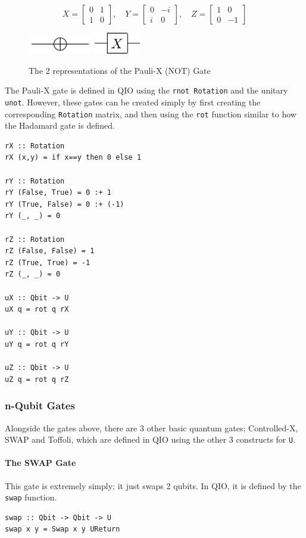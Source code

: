 \documentclass[a4paper,11pt, titlepage, twoside]{article}
\begin{document}
$$
X = 
\begin{bmatrix}
	0 & 1 \\
	1 & 0
\end{bmatrix},
\quad Y =
\begin{bmatrix}
	0 & -i \\
	i & 0
\end{bmatrix},
\quad Z =
\begin{bmatrix}
	1 & 0 \\
	0 & -1
\end{bmatrix}$$
\begin{figure}[H]
	\centering
	\includegraphics[width=0.25\textwidth]{not}
	\includegraphics[width=0.18\textwidth]{paulix}
	\caption{The 2 representations of the Pauli-X (NOT) Gate}
\end{figure}
The Pauli-X gate is defined in QIO using the \texttt{rnot Rotation} and the unitary \texttt{unot}. However, these gates can be created simply by first creating the corresponding \texttt{Rotation} matrix, and then using the \texttt{rot} function similar to how the Hadamard gate is defined.

\begin{verbatim}
rX :: Rotation
rX (x,y) = if x==y then 0 else 1

rY :: Rotation
rY (False, True) = 0 :+ 1
rY (True, False) = 0 :+ (-1)
rY (_, _) = 0

rZ :: Rotation
rZ (False, False) = 1
rZ (True, True) = -1
rZ (_, _) = 0

uX :: Qbit -> U
uX q = rot q rX

uY :: Qbit -> U
uY q = rot q rY

uZ :: Qbit -> U
uZ q = rot q rZ
\end{verbatim}

\subsubsection{n-Qubit Gates}
Alongside the gates above, there are 3 other basic quantum gates; Controlled-X, SWAP and Toffoli, which are defined in QIO using the other 3 constructs for \texttt{U}.

\paragraph{The SWAP Gate}
This gate is extremely simply; it just swaps 2 qubits. In QIO, it is defined by the \texttt{swap} function.
\begin{verbatim}
swap :: Qbit -> Qbit -> U
swap x y = Swap x y UReturn
\end{verbatim}
\end{document}
